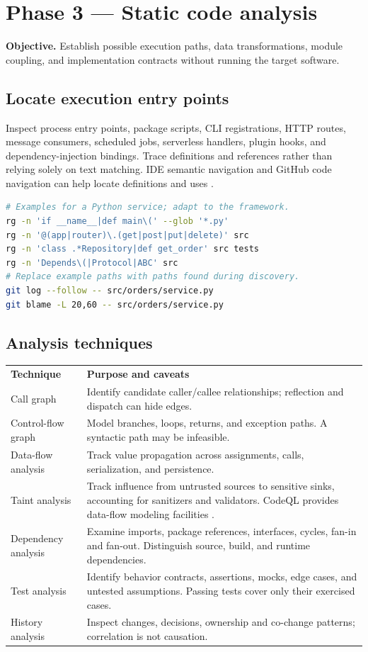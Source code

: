 \documentclass[11pt,letterpaper]{article}
\newcommand{\tablehead}[2]{\rowcolor{navy}\color{white}\textbf{#1}&\color{white}\textbf{#2}\\}
\begin{document}
\section{Phase 3 --- Static code analysis}
\textbf{Objective.} Establish possible execution paths, data transformations, module coupling, and implementation contracts without running the target software.
\subsection{Locate execution entry points}
Inspect process entry points, package scripts, CLI registrations, HTTP routes, message consumers, scheduled jobs, serverless handlers, plugin hooks, and dependency-injection bindings. Trace definitions and references rather than relying solely on text matching. IDE semantic navigation and GitHub code navigation can help locate definitions and uses \cite{githubnav}.
\begin{lstlisting}[language=bash]
# Examples for a Python service; adapt to the framework.
rg -n 'if __name__|def main\(' --glob '*.py'
rg -n '@(app|router)\.(get|post|put|delete)' src
rg -n 'class .*Repository|def get_order' src tests
rg -n 'Depends\(|Protocol|ABC' src
# Replace example paths with paths found during discovery.
git log --follow -- src/orders/service.py
git blame -L 20,60 -- src/orders/service.py
\end{lstlisting}
\subsection{Analysis techniques}

\noindent\begin{tabularx}{\linewidth}{@{}P{1.55in}Y@{}}
\tablehead{Technique}{Purpose and caveats}
Call graph & Identify candidate caller/callee relationships; reflection and dispatch can hide edges.\\
Control-flow graph & Model branches, loops, returns, and exception paths. A syntactic path may be infeasible.\\
Data-flow analysis & Track value propagation across assignments, calls, serialization, and persistence.\\
Taint analysis & Track influence from untrusted sources to sensitive sinks, accounting for sanitizers and validators. CodeQL provides data-flow modeling facilities \cite{codeql}.\\
Dependency analysis & Examine imports, package references, interfaces, cycles, fan-in and fan-out. Distinguish source, build, and runtime dependencies.\\
Test analysis & Identify behavior contracts, assertions, mocks, edge cases, and untested assumptions. Passing tests cover only their exercised cases.\\
History analysis & Inspect changes, decisions, ownership and co-change patterns; correlation is not causation.\\
\bottomrule
\end{tabularx}
\end{document}
